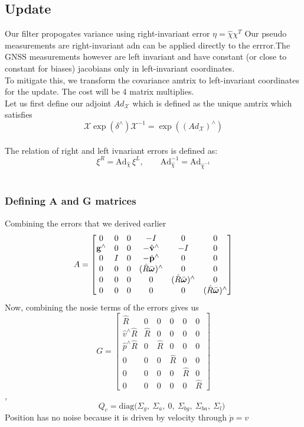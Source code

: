 
\subsection{Update}
Our filter propogates variance using right-invariant error $\eta = \hat \chi \chi^T$
Our pseudo measurements are right-invariant adn can be applied directly to the errror.The GNSS measurements however are left invariant and have constant (or close to constant for biases) jacobians only in left-invariant coordinates. \\
To mitigate this, we transform the covariance amtrix to left-invariant coordinates for the update. The cost will be 4 matrix multiplies.\\
Let us first define our adjoint $Ad_\mathcal{X}$ which is defined as the unique amtrix which satisfies $$\mathcal{X} \exp(\delta^\wedge)\mathcal{X}^{-1} = \exp((Ad_\mathcal{X})^\wedge)$$\\
The relation of right and left ivnariant errors is defined as:
$$\xi^R = \mathrm{Ad}_{\hat\chi}\,\xi^L, \qquad \mathrm{Ad}_{\hat\chi}^{-1} = \mathrm{Ad}_{\hat\chi^{-1}}$$\\
\subsubsection{Defining A and G matrices}
Combining the errors that we derived earlier
$$
A = \begin{bmatrix}
0 & 0 & 0 & -I & 0 & 0 \\
\mathbf{g}^\wedge & 0 & 0 & -\hat{\mathbf{v}}^\wedge & -I & 0 \\
0 & I & 0 & -\hat{\mathbf{p}}^\wedge & 0 & 0 \\
0 & 0 & 0 & (\hat{R}\bar{\boldsymbol{\omega}})^\wedge & 0 & 0 \\
0 & 0 & 0 & 0 & (\hat{R}\bar{\boldsymbol{\omega}})^\wedge & 0 \\
0 & 0 & 0 & 0 & 0 & (\hat{R}\bar{\boldsymbol{\omega}})^\wedge
\end{bmatrix}
$$
Now, combining the nosie terms of the errors gives us 
$$
G = \begin{bmatrix}
\hat R & 0 & 0 & 0 & 0 & 0 \\
\hat v^\wedge\hat R & \hat R & 0 & 0 & 0 & 0 \\
\hat p^\wedge\hat R & 0 & \hat R & 0 & 0 & 0 \\
0 & 0 & 0 & \hat R & 0 & 0 \\
0 & 0 & 0 & 0 & \hat R & 0 \\
0 & 0 & 0 & 0 & 0 & \hat R
\end{bmatrix}$$,\\$$ \qquad Q_c = \mathrm{diag}\big(\Sigma_g,\ \Sigma_a,\ 0,\ \Sigma_{bg},\ \Sigma_{ba},\ \Sigma_l\big)
$$
Position has no noise because it is driven by velocity through $\dot p = v$

